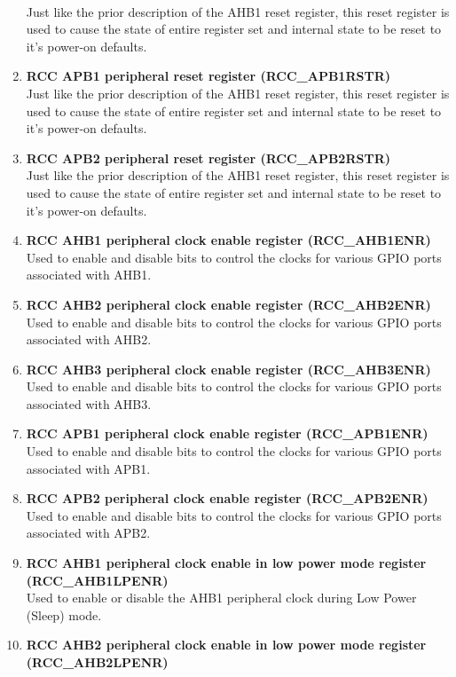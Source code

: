 \documentclass[footheight=20pt, footsepline, headheight=20pt, headsepline]{scrartcl}
\begin{document}
\begin{enumerate}
    \\ Just like the prior description of the AHB1 reset register, this reset register is used to cause the state of entire register set and internal state to be reset to it's power-on defaults.
    \item\textbf{RCC APB1 peripheral reset register (RCC\_APB1RSTR)}
    \\ Just like the prior description of the AHB1 reset register, this reset register is used to cause the state of entire register set and internal state to be reset to it's power-on defaults.
    \item\textbf{RCC APB2 peripheral reset register (RCC\_APB2RSTR)}
    \\ Just like the prior description of the AHB1 reset register, this reset register is used to cause the state of entire register set and internal state to be reset to it's power-on defaults.
    \item \textbf{RCC AHB1 peripheral clock enable register (RCC\_AHB1ENR) }
    \\ Used to enable and disable bits to control the clocks for various GPIO ports associated with AHB1.
    \item \textbf{RCC AHB2 peripheral clock enable register (RCC\_AHB2ENR) }
    \\ Used to enable and disable bits to control the clocks for various GPIO ports associated with AHB2.
    \item \textbf{RCC AHB3 peripheral clock enable register (RCC\_AHB3ENR) }
    \\ Used to enable and disable bits to control the clocks for various GPIO ports associated with AHB3.
    \item \textbf{RCC APB1 peripheral clock enable register (RCC\_APB1ENR) }
    \\ Used to enable and disable bits to control the clocks for various GPIO ports associated with APB1.
    \item \textbf{RCC APB2 peripheral clock enable register (RCC\_APB2ENR) }
    \\ Used to enable and disable bits to control the clocks for various GPIO ports associated with APB2.
    \item \textbf{RCC AHB1 peripheral clock enable in low power mode register (RCC\_AHB1LPENR)}
    \\ Used to enable or disable the AHB1 peripheral clock during Low Power (Sleep) mode.
    \item \textbf{RCC AHB2 peripheral clock enable in low power mode register (RCC\_AHB2LPENR)}

\end{enumerate}
\end{document}
